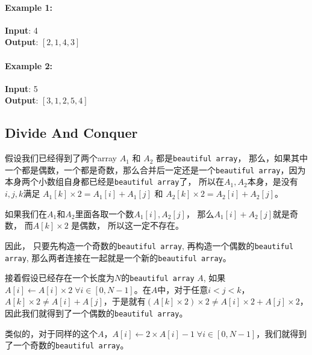 \paragraph{Example 1:}
\begin{flushleft}
\textbf{Input}: 4
\\
\textbf{Output}: $[2,1,4,3]$
\end{flushleft}
\paragraph{Example 2:}
\begin{flushleft}
\textbf{Input}: 5
\\
\textbf{Output}: $[3,1,2,5,4]$
\end{flushleft}
\subsection{Divide And Conquer}
\begin{CJK*}{UTF8}{gbsn}
假设我们已经得到了两个array $A_1$ 和 $A_2$ 都是\texttt{beautiful array}， 那么，如果其中一个都是偶数，一个都是奇数，那么合并后一定还是一个\texttt{beautiful array}，因为本身两个小数组自身都已经是\texttt{beautiful array}了， 所以在$A_1, A_2$本身，是没有$i,j,k$满足 $A_1[k] \times 2 = A_1[i] + A_1[j]$ 和 $A_2[k] \times 2 = A_2[i] + A_2[j]$。
\par
如果我们在$A_1$和$A_2$里面各取一个数$A_1[i], A_2[j]$， 那么$A_1[i] + A_2[j]$就是奇数， 而$A[k]\times 2$ 是偶数， 所以这一定不存在。
\par
因此， 只要先构造一个奇数的\texttt{beautiful array}, 再构造一个偶数的\texttt{beautiful array}, 那么两者连接在一起就是一个新的\texttt{beautiful array}。
\par
接着假设已经存在一个长度为$N$的\texttt{beautiful array} $A$, 如果$A[i]\gets A[i]\times 2\; \forall i\in [0,N-1]$。在$A$中，对于任意$i<j<k$，$A[k]\times 2 \neq A[i] + A[j]$，于是就有$(A[k]\times2)\times2 \neq A[i]\times 2+ A[j]\times 2$，因此我们就得到了一个偶数的\texttt{beautiful array}。
\par
类似的，对于同样的这个$A$，$A[i] \gets 2\times A[i]-1\; \forall i \in [0, N-1]$，我们就得到了一个奇数的\texttt{beautiful array}。
\end{CJK*}
